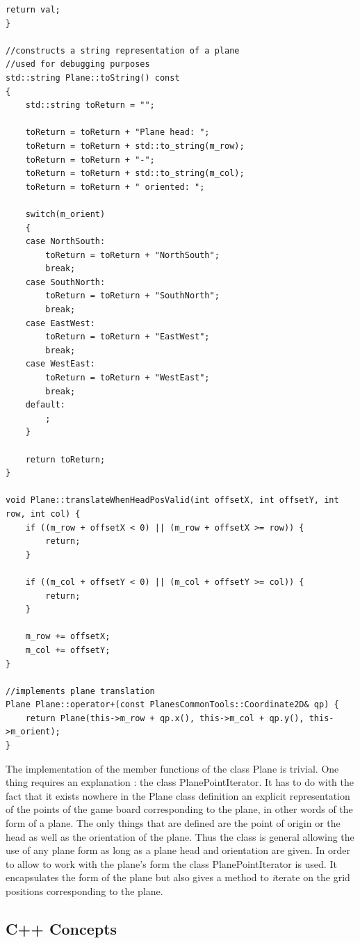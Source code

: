 \begin{lstlisting}[caption = {Plane Class Methods}, captionpos = b, label=plane_implementation]
    return val;
}

//constructs a string representation of a plane
//used for debugging purposes
std::string Plane::toString() const
{
    std::string toReturn = "";

    toReturn = toReturn + "Plane head: ";
    toReturn = toReturn + std::to_string(m_row);
    toReturn = toReturn + "-";
    toReturn = toReturn + std::to_string(m_col);
    toReturn = toReturn + " oriented: ";

    switch(m_orient)
    {
    case NorthSouth:
        toReturn = toReturn + "NorthSouth";
        break;
    case SouthNorth:
        toReturn = toReturn + "SouthNorth";
        break;
    case EastWest:
        toReturn = toReturn + "EastWest";
        break;
    case WestEast:
        toReturn = toReturn + "WestEast";
        break;
    default:
        ;
    }

    return toReturn;
}

void Plane::translateWhenHeadPosValid(int offsetX, int offsetY, int row, int col) {
    if ((m_row + offsetX < 0) || (m_row + offsetX >= row)) {
        return;
    }

    if ((m_col + offsetY < 0) || (m_col + offsetY >= col)) {
        return;
    }

    m_row += offsetX;
    m_col += offsetY;
}

//implements plane translation
Plane Plane::operator+(const PlanesCommonTools::Coordinate2D& qp) {
    return Plane(this->m_row + qp.x(), this->m_col + qp.y(), this->m_orient);
}
\end{lstlisting}

The implementation of the member functions of the class Plane is trivial. One thing requires an explanation : the class PlanePointIterator. It has to do with the fact that it exists nowhere in the Plane class definition an explicit representation of the points of the game board corresponding to the plane, in other words of the form of a plane. The only things that are defined are the point of origin or the head as well as the orientation of the plane. Thus the class is general allowing the use of any plane form as long as a plane head and orientation are given. In order to allow to work with the plane's form the class PlanePointIterator is used. It encapsulates the form of the plane but also gives a method to \textit iterate on the grid positions corresponding to the plane. 

\subsection {C++ Concepts}

